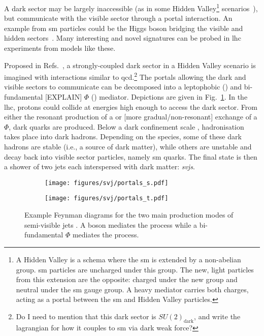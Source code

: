 A dark sector may be largely inaccessible (as in some Hidden Valley\footnote{A Hidden Valley is a schema where the \acrlong{sm} is extended by a non-abelian group. \acrshort{sm} particles are uncharged under this group. The new, light particles from this extension are the opposite: charged under the new group and neutral under the \acrshort{sm} gauge group. A heavy mediator carries both charges, acting as a portal between the \acrlong{sm} and Hidden Valley particles.} scenarios~\cite{Strassler:2006im}), but communicate with the visible sector through a portal interaction. An example from \acrshort{sm} particles could be the Higgs boson bridging the visible and hidden sectors~\cite{higgs_portal_singlet_dm,Arcadi:2019lka}. Many interesting and novel signatures can be probed in \acrshort{lhc} experiments from models like these.

Proposed in Refs.~, a strongly-coupled dark sector in a Hidden Valley scenario is imagined with interactions similar to \acrshort{qcd}.\footnote{Do I need to mention that this dark sector is $SU(2)_{\mathrm{dark}}$, and write the lagrangian for how it couples to \acrshort{sm} via dark weak force?} The portals allowing the dark and visible sectors to communicate can be decomposed into a leptophobic \PZprime (\schannel) and bi-fundamental [EXPLAIN] $\Phi$ (\tchannel) mediator. Depictions are given in Fig.~\ref{fig:theory_svj_portals}. In the \acrshort{lhc}, protons could collide at energies high enough to access the dark sector. From either the resonant production of a \PZprime or [more gradual/non-resonant] exchange of a $\Phi$, dark quarks \Pqdark are produced. Below a dark confinement scale \lamDark, hadronisation takes place into dark hadrons. Depending on the species, some of these dark hadrons are stable (i.e., a source of dark matter), while others are unstable and decay back into visible sector particles, namely \acrlong{sm} quarks. The final state is then a shower of two \glspl{jet} each interspersed with dark matter: \emph{\glspl{svj}}.

\begin{figure}[htbp]
    \centering
    \begin{subfigure}[c]{0.45\textwidth}
    \centering
        \texttt{[image: figures/svj/portals\_s.pdf]}
        \caption{\schannel}
    \end{subfigure}
    \hfill
    \begin{subfigure}[c]{0.45\textwidth}
    \centering
        \texttt{[image: figures/svj/portals\_t.pdf]}
        \caption{\tchannel}
    \end{subfigure}
\caption[Example Feynman diagrams for the two main production modes of semi-visible jets. A \PZprime boson mediates the \schannel process while a bi-fundamental $\Phi$ mediates the \tchannel process]{Example Feynman diagrams for the two main production modes of semi-visible jets \cite{Cohen:2017pzm}. A \PZprime boson mediates the \schannel process while a bi-fundamental $\Phi$ mediates the \tchannel process.}
\label{fig:theory_svj_portals}
\end{figure}


